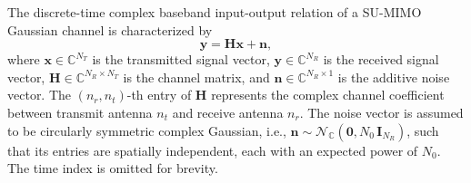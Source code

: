 The discrete-time complex baseband input-output relation of a \ac{SU}-\ac{MIMO} Gaussian channel is characterized by
\begin{equation}
    \mathbf{y} = \mathbf{H}\mathbf{x} + \mathbf{n},
\label{eq:su_mimo_io}
\end{equation}
where $\mathbf{x} \in \mathbb{C}^{N_T}$ is the transmitted signal vector, $\mathbf{y} \in \mathbb{C}^{N_R}$ is the received signal vector, $\mathbf{H} \in \mathbb{C}^{N_R \times N_T}$ is the channel matrix, and $\mathbf{n} \in \mathbb{C}^{N_R \times 1}$ is the additive noise vector.
The $(n_r, n_t)$-th entry of $\mathbf{H}$ represents the complex channel coefficient between transmit antenna $n_t$ and receive antenna $n_r$.
The noise vector is assumed to be circularly symmetric complex Gaussian, i.e., $\mathbf{n} \sim \mathcal{N}_{\mathbb{C}}(\mathbf{0}, N_0 \, \mathbf{I}_{N_R})$, such that its entries are spatially independent, each with an expected power of $N_0$.
The time index is omitted for brevity.

